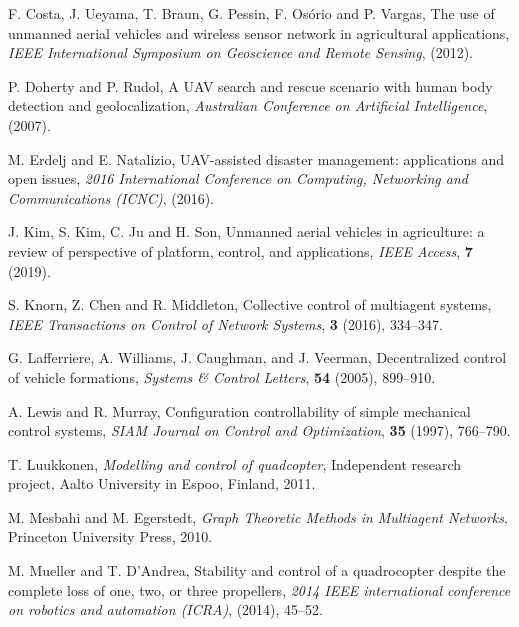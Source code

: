\documentclass{aims}
\theoremstyle{definition}
\begin{document}
\begin{thebibliography}{99}
    \newblock F. Costa, J. Ueyama, T. Braun, G. Pessin, F. Os\'{o}rio and P. Vargas,
    \newblock The use of unmanned aerial vehicles and wireless sensor network in agricultural applications,
    \newblock \emph{IEEE International Symposium on Geoscience and Remote Sensing}, (2012).

    \newblock P. Doherty and P. Rudol,
    \newblock A UAV search and rescue scenario with human body detection and geolocalization,
    \newblock \emph{Australian Conference on Artificial Intelligence}, (2007).

    \newblock M. Erdelj and E. Natalizio,
    \newblock UAV-assisted disaster management: applications and open issues,
    \newblock \emph{2016 International Conference on Computing, Networking and Communications  (ICNC)}, (2016).

    \newblock J. Kim, S. Kim, C. Ju and H. Son,
    \newblock Unmanned aerial vehicles in agriculture: a review of perspective of platform, control, and applications,
    \newblock \emph{IEEE Access}, \textbf{7} (2019).

    \newblock S. Knorn, Z. Chen and R. Middleton,
    \newblock Collective control of multiagent systems,
    \newblock \emph{IEEE Transactions on Control of Network Systems}, \textbf{3} (2016), 334--347.

    \newblock G. Lafferriere, A. Williams, J. Caughman, and J. Veerman,
    \newblock Decentralized control of vehicle formations,
    \newblock \emph{Systems \& Control Letters}, \textbf{54} (2005), 899--910.

	\newblock A. Lewis and R. Murray,
	\newblock Configuration controllability of simple mechanical control systems, 
	\newblock \emph{SIAM Journal on Control and Optimization}, \textbf{35} (1997), 766--790.

    \newblock T. Luukkonen,
    \newblock  \emph{Modelling and control of quadcopter},
    \newblock  Independent research project, Aalto University in Espoo, Finland, 2011.

    \newblock M.  Mesbahi  and  M.  Egerstedt,
    \newblock \emph{Graph  Theoretic  Methods  in  Multiagent  Networks},
    \newblock Princeton University Press, 2010.

     \newblock M. Mueller and T. D'Andrea, 
     \newblock Stability and control of a quadrocopter despite the complete loss of one, two, or three propellers,
     \newblock \emph{2014 IEEE international conference on robotics and automation (ICRA)}, (2014), 45--52.


\end{thebibliography}
\end{document}
